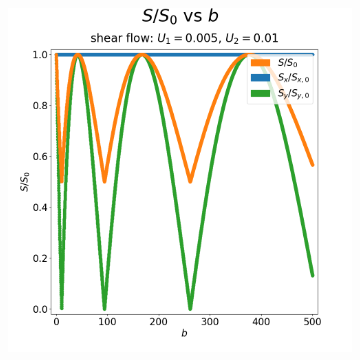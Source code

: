 \begin{figure}
\begin{subfigure}{0.5\textwidth}
                        \caption{}
                        \label{fig:mri-shear-1:quiver}
                    \end{subfigure}
                    \\
                    \begin{subfigure}{0.4\textwidth}
                        \centering
                        \includegraphics[width=\textwidth]{diagrams/results-mri/simple-tests/mri-spins_sall-vs-b_2D_shear_test_1.png}
                        \caption{}
                        \label{fig:mri-shear-1:s-vs-b}
                    \end{subfigure}
                    \vspace{4mm} %
                    \begin{subfigure}{0.4\textwidth}
                        \centering

\end{subfigure}
\end{figure}

